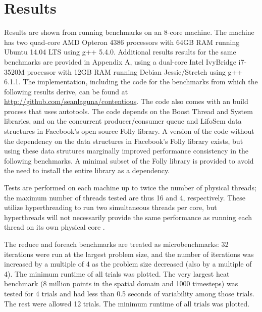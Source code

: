 \chapter{Results}

Results are shown from running benchmarks on an 8-core machine. The machine has
two quad-core AMD Opteron 4386 processors with 64GB RAM running Ubuntu 14.04 LTS
using g++ 5.4.0.
Additional results results for the same benchmarks are provided in Appendix A,
using a dual-core Intel IvyBridge i7-3520M processor with 12GB RAM running
Debian Jessie/Stretch using g++ 6.1.1.
The implementation, including the code for the benchmarks from which the
following results derive, can be found at
\url{http://github.com/seanlaguna/contentious}. The code also comes with an
build process that uses autotools. The code depends on the Boost Thread and
System libraries, and on the concurrent producer/consumer queue and LifoSem data
structures in Facebook's open source Folly library. A version of the code
without the dependency on the data structures in Facebook's Folly library
exists, but using these data strutures marginally improved performance
consistency in the following benchmarks. A minimal subset of the Folly library
is provided to avoid the need to install the entire library as a dependency.

Tests are performed on each machine up to twice the number of physical threads;
the maximum number of threads tested are thus 16 and 4, respectively. These
utilize hyperthreading to run two simultaneous threads per core, but
hyperthreads will not necessarily provide the same performance as running each
thread on its own physical core \cite{openmp}.

The reduce and foreach benchmarks are treated as microbenchmarks: 32 iterations
were run at the largest problem size, and the number of iterations was increased
by a multiple of 4 as the problem size decreased (also by a multiple of 4). The
minimum runtime of all trials was plotted. The very largest heat benchmark (8
million points in the spatial domain and 1000 timesteps) was tested for 4 trials
and had less than 0.5 seconds of variability among those trials. The rest were
allowed 12 trials. The minimum runtime of all trials was plotted.

